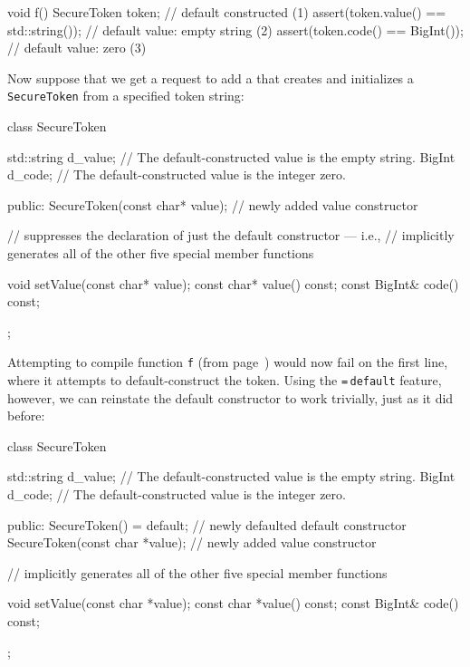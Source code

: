 \begin{emcppslisting}[language=C++,label=default-voidf-code]
void f()
{
    SecureToken token;                       // default constructed         (1)
    assert(token.value() == std::string());  // default value: empty string (2)
    assert(token.code() == BigInt());        // default value: zero         (3)
}
\end{emcppslisting}
    
\noindent Now suppose that we get a request to add a 
that creates and initializes a \lstinline!SecureToken! from a specified
token string:

\begin{emcppslisting}[language=C++]
class SecureToken
{
    std::string d_value;  // The default-constructed value is the empty string.
    BigInt      d_code;   // The default-constructed value is the integer zero.

public:
    SecureToken(const char* value);  // newly added value constructor

    // suppresses the declaration of just the default constructor --- i.e.,
    // implicitly generates all of the other five special member functions

    void setValue(const char* value);
    const char* value() const;
    const BigInt& code() const;
};
\end{emcppslisting}
    
\noindent Attempting to compile function \lstinline!f! (from page~\pageref{default-voidf-code}) would now fail on the
first line, where it attempts to default-construct the token. Using
the \lstinline!=!\,\lstinline!default! feature, however, we can reinstate the
default constructor to work trivially, just as
it did before:

\begin{emcppslisting}[language=C++]
class SecureToken
{
    std::string d_value;  // The default-constructed value is the empty string.
    BigInt d_code;        // The default-constructed value is the integer zero.

public:
    SecureToken() = default;         // newly defaulted default constructor
    SecureToken(const char *value);  // newly added value constructor

    // implicitly generates all of the other five special member functions

    void setValue(const char *value);
    const char *value() const;
    const BigInt& code() const;
};
\end{emcppslisting}
    

